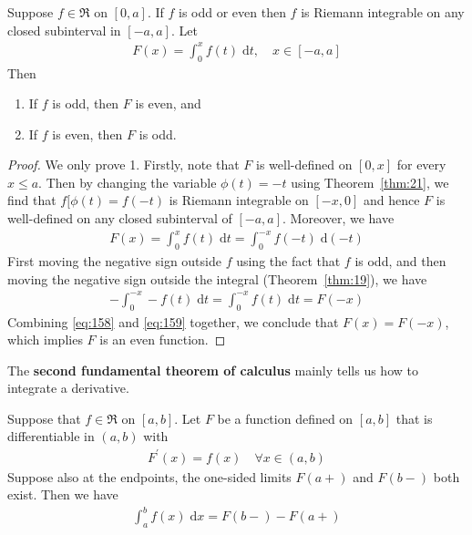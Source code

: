 \documentclass[thmcnt=section, 12pt]{my-elegantbook}
\begin{document}
\begin{theorem} \label{thm:93}
    Suppose $f \in \mathfrak{R}$ on $[0, a]$.
    If $f$ is odd or even
    then $f$ is Riemann integrable on any closed subinterval
    in $[-a, a]$.
    Let
    \begin{align*}
        F(x) = \int_0^x f(t) \; \mathrm{d} t,
        \quad
        x \in [-a, a]
    \end{align*}
    Then
    \begin{enumerate}
        \item If $f$ is odd,
              then $F$ is even, and
        \item If $f$ is even,
              then $F$ is odd.
    \end{enumerate}
\end{theorem}

\begin{proof}
    We only prove 1.
    Firstly, note that $F$ is well-defined on $[0, x]$
    for every $x \leq a$.
    Then by changing the variable $\phi(t) = -t$
    using Theorem~\ref{thm:21},
    we find that $f[\phi(t) = f(-t)$ is Riemann integrable
    on $[-x, 0]$ and hence $F$ is well-defined on any
    closed subinterval of $[-a, a]$.
    Moreover, we have
    \begin{align}
        F(x)
        = \int_0^x f(t) \; \mathrm{d} t
        = \int_{0}^{-x} f(-t) \; \mathrm{d} (-t)
        \label{eq:158}
    \end{align}
    First moving the negative sign outside $f$ using the fact
    that $f$ is odd,
    and then moving the negative sign outside the integral
    (Theorem~\ref{thm:19}),
    we have
    \begin{align}
        -\int_{0}^{-x} -f(t) \; \mathrm{d} t
        = \int_{0}^{-x} f(t) \; \mathrm{d} t
        = F(-x)
        \label{eq:159}
    \end{align}
    Combining \eqref{eq:158} and \eqref{eq:159} together,
    we conclude that $F(x) = F(-x)$,
    which implies $F$ is an even function.
\end{proof}


The \textbf{second fundamental theorem of calculus}
mainly tells us how to integrate a derivative.

\begin{theorem} \label{thm:82}
    Suppose that $f \in \mathfrak{R}$ on $[a, b]$.
    Let $F$ be a function defined on $[a, b]$
    that is differentiable in $(a, b)$
    with
    \begin{align*}
        F^\prime(x) = f(x)
        \quad \forall x \in (a, b)
    \end{align*}
    Suppose also at the endpoints, the one-sided limits
    $F(a+)$ and $F(b-)$ both exist.
    Then we have
    \begin{align}
        \int_a^b f(x) \; \mathrm{d} x
        = F(b-) - F(a+)
        \label{eq:144}
    \end{align}
\end{theorem}
\end{document}
